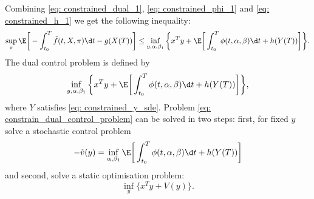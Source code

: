 Combining \eqref{eq: constrained_dual_1}, \eqref{eq: constrained_phi_1} and \eqref{eq: constrained_h_1} we get the following inequality:
\begin{equation*}
    \sup_{\pi} \E \bigg[ - \int_{t_0}^T \Tilde{f}(t, X, \pi) \d t - g(X(T)) \bigg] \le \inf_{y, \alpha, \beta_1} \bigg\{ x^T y + \E \bigg[ \int_{t_0}^T \phi(t, \alpha, \beta) \d t + h(Y(T)) \bigg]  \bigg\}.
\end{equation*}
The dual control problem is defined by
\begin{equation}
    \inf_{y, \alpha, \beta_1} \bigg\{ x^T y + \E \bigg[ \int_{t_0}^T \phi(t, \alpha, \beta) \d t + h(Y(T)) \bigg]  \bigg\}, \label{eq: constrain_dual_control_problem}
\end{equation}
where $Y$ satisfies \eqref{eq: constrained_y_sde}. Problem \eqref{eq: constrain_dual_control_problem} can be solved in two steps: first, for fixed $y$ solve a stochastic control problem
\begin{equation}
    - \tilde{v}(y) = \inf_{\alpha, \beta_1} \E \bigg[ \int_{t_0}^T \phi(t, \alpha, \beta) \d t + h(Y(T)) \bigg] \label{eq: constrained_dual_value_function_1}
\end{equation}
and second, solve a static optimisation problem:
\begin{equation}
    \inf_y \big \{ x^T y + V(y)  \big \}.
\end{equation}


